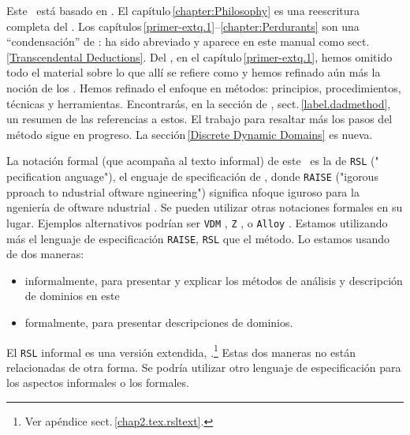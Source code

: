 \begynd
\pind Este \manual\ está basado en \cite[nov.\,2021]{BjornerMonograph2020}.
\pind El capítulo\,\ref{chapter:Philosophy} es una reescritura completa del
      \cite[capítulo\,2]{BjornerMonograph2020}.  
\pind Los capítulos\,\ref{primer-extq.1}--\ref{chapter:Perdurants} son una
      ``condensación'' de \cite[capítulos\,4--7]{BjornerMonograph2020}:
\begynd
\pind \cite[Capítulo\,6]{BjornerMonograph2020} ha sido abreviado y
      aparece en este manual como sect.\,\ref{Transcendental Deductions}.
\pind Del \cite[capítulo\,4]{BjornerMonograph2020}, en el
      capítulo\,\ref{primer-extq.1}, hemos omitido todo 
      el material sobre lo que allí se refiere como  
\pind y hemos refinado aún más la noción de los .
\afslut
\pind Hemos refinado el enfoque en métodos: principios, procedimientos,
      técnicas y herramientas.
\begynd
\pind Encontrarás, en la sección de ,
      sect.\,\vref{label.dadmethod}, un resumen de las referencias a estos.
\pind El trabajo para resaltar más los pasos del método sigue en progreso.
\afslut
\pind La sección\,\ref{Discrete Dynamic Domains} es nueva. 
\afslut

\label{RSL-I}

\begynd
\pind La notación formal (que acompaña al texto informal) de este
     \manual\ es la de \texttt{RSL} \cite{RSL} (" pecification anguage"), el enguaje de
      specificación de , donde \texttt{RAISE} ("igorous pproach to ndustrial oftware ngineering")
      significa nfoque iguroso para la
      ngeniería de oftware ndustrial \cite{RaiseMethod}. 
\pind Se pueden utilizar otras notaciones formales en su lugar.
\pind Ejemplos alternativos podrían ser \texttt{VDM} \citevdm, \texttt{Z}
      \citez, o \texttt{Alloy} \citealloy.
\pind Estamos utilizando más el lenguaje de especificación \texttt{RAISE},
      \texttt{RSL} que el método.
\pind Lo estamos usando de dos maneras:
\begin{itemize}
\item informalmente, para presentar y explicar los métodos de análisis y
      descripción de dominios en este \manual
\item formalmente, para presentar descripciones de dominios. 
\end{itemize}
\pind El \texttt{RSL} informal es una versión extendida,
\rslplus.\footnote{Ver apéndice sect.\,\vref{chap2.tex.rsltext}.}
\pind Estas dos maneras no están relacionadas de otra forma.
\pind Se podría utilizar otro lenguaje de especificación  para los
      aspectos informales o  los formales.
\afslut


